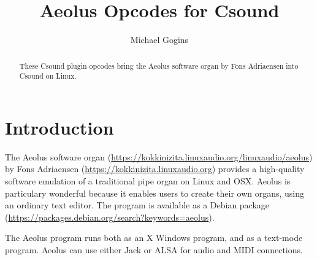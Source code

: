\documentclass[english,11pt,letterpaper,onecolumn]{scrartcl}
\title{Aeolus Opcodes for Csound}
\author{Michael Gogins}
\begin{document}
	
\maketitle

\begin{abstract}
	These Csound plugin opcodes bring the Aeolus software organ by Fons Adriaensen into Csound on Linux.
\end{abstract}

\section{Introduction}

The Aeolus software organ (\url{https://kokkinizita.linuxaudio.org/linuxaudio/aeolus}) by Fons Adriaensen (\url{https://kokkinizita.linuxaudio.org}) provides a high-quality software emulation of a traditional pipe organ on Linux and OSX. Aeolus is particulary wonderful because it enables users to create their own organs, using an ordinary text editor. The program is available as a Debian package (\url{https://packages.debian.org/search?keywords=aeolus}).

The Aeolus program runs both as an X Windows program, and as a text-mode program. Aeolus can use either Jack or ALSA for audio and MIDI connections.
\end{document}
